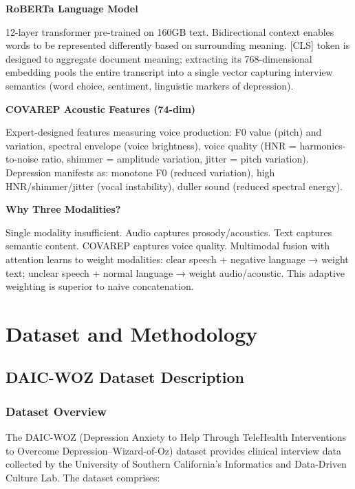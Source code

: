 \documentclass[12pt]{article}
\begin{document}
	\textbf{RoBERTa Language Model}

	12-layer transformer pre-trained on 160GB text. Bidirectional context enables words to be represented differently based on surrounding meaning. [CLS] token is designed to aggregate document meaning; extracting its 768-dimensional embedding pools the entire transcript into a single vector capturing interview semantics (word choice, sentiment, linguistic markers of depression).

	\textbf{COVAREP Acoustic Features (74-dim)}

	Expert-designed features measuring voice production: F0 value (pitch) and variation, spectral envelope (voice brightness), voice quality (HNR = harmonics-to-noise ratio, shimmer = amplitude variation, jitter = pitch variation). Depression manifests as: monotone F0 (reduced variation), high HNR/shimmer/jitter (vocal instability), duller sound (reduced spectral energy).

	\textbf{Why Three Modalities?}

	Single modality insufficient. Audio captures prosody/acoustics. Text captures semantic content. COVAREP captures voice quality. Multimodal fusion with attention learns to weight modalities: clear speech + negative language → weight text; unclear speech + normal language → weight audio/acoustic. This adaptive weighting is superior to naive concatenation.


	\section{Dataset and Methodology}

	\subsection{DAIC-WOZ Dataset Description}

	\subsubsection{Dataset Overview}

	The DAIC-WOZ (Depression Anxiety to Help Through TeleHealth Interventions to Overcome Depression--Wizard-of-Oz) dataset provides clinical interview data collected by the University of Southern California's Informatics and Data-Driven Culture Lab. The dataset comprises:
\end{document}
